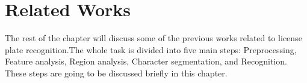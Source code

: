 \section{Related Works}
The rest of the chapter will discuss some of the previous works related to license plate recognition.The whole task is divided into five main steps: Preprocessing, Feature analysis, Region analysis, Character segmentation, and Recognition. These steps are going to be discussed briefly in this chapter.
	
    

